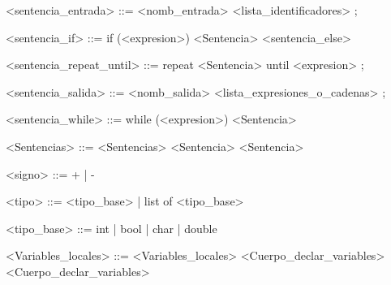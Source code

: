 \begin{grammar}
<sentencia_entrada> ::= <nomb_entrada> <lista_identificadores> ;

<sentencia_if> ::= if (<expresion>) <Sentencia> <sentencia_else>

<sentencia_repeat_until> ::= repeat <Sentencia> until <expresion> ;

<sentencia_salida> ::= <nomb_salida> <lista_expresiones_o_cadenas> ;

<sentencia_while> ::= while (<expresion>) <Sentencia>

<Sentencias> ::= <Sentencias> <Sentencia>
\alt <Sentencia>

<signo> ::= + | -

<tipo> ::= <tipo_base> | list of <tipo_base>

<tipo_base> ::= int | bool | char | double

<Variables_locales> ::= <Variables_locales> <Cuerpo_declar_variables>
\alt <Cuerpo_declar_variables>

\end{grammar}
